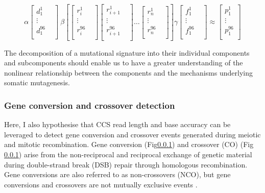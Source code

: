 \begin{equation} \label{eq:4}
\alpha \begin{bmatrix}
    d^{1}_{1}  \\
    \vdots &  \\
    d^{96}_{1}  \\
\end{bmatrix} \
\beta \left[\begin{bmatrix}
    r^{1}_{i} \\
    \vdots &  \\
    r^{96}_{i} \\
\end{bmatrix} 
\begin{bmatrix}
    r^{1}_{i+1} \\
    \vdots &  \\
    r^{96}_{i+1} \\
\end{bmatrix} \ldots 
\begin{bmatrix}
    r^{1}_{n} \\
    \vdots &  \\
    r^{96}_{n} \\
\end{bmatrix}\right]
\gamma \begin{bmatrix}
    f^{1}_{1}  \\
    \vdots &  \\
    f^{96}_{1}  \\
\end{bmatrix} \approx
\begin{bmatrix}
    p^{1}_{1} \\
    \vdots \\
    p^{96}_{1} \\
\end{bmatrix}
\end{equation}

The decomposition of a mutational signature into their individual components and subcomponents should enable us to have a greater understanding of the nonlinear relationship between the components and the mechanisms underlying somatic mutagenesis.

\subsubsection{Gene conversion and crossover detection}

 
Here, I also hypothesise that CCS read length and base accuracy can be leveraged to detect gene conversion and crossover events generated during meiotic and mitotic recombination. Gene conversion (Fig\ref{}) and crossover (CO) (Fig \ref{}) arise from the non-reciprocal and reciprocal exchange of genetic material during double-strand break (DSB) repair through homologous recombination. Gene conversions are also referred to as non-crossovers (NCO), but gene conversions and crossovers are not mutually exclusive events \cite{}. 
 
